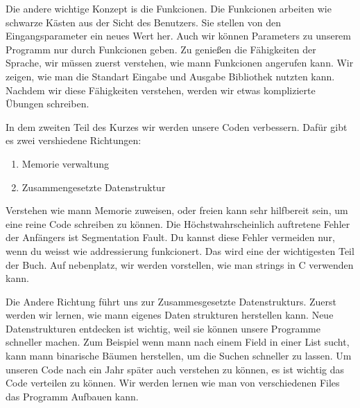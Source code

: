 Die andere wichtige Konzept is die Funkcionen. Die Funkcionen arbeiten wie schwarze K\"asten aus der Sicht des Benutzers. Sie stellen von
den Eingangsparameter ein neues Wert her. Auch wir können Parameters zu unserem Programm nur durch Funkcionen geben.  Zu genießen
die Fähigkeiten der Sprache, wir müssen zuerst verstehen, wie mann Funkcionen angerufen kann. Wir zeigen,
wie man die Standart Eingabe und Ausgabe Bibliothek nutzten kann. Nachdem wir diese F\"ahigkeiten verstehen, werden wir etwas
komplizierte \"Ubungen schreiben.

In dem zweiten Teil des Kurzes wir werden unsere Coden verbessern. Dafür gibt es zwei vershiedene
Richtungen:
\begin{enumerate}
\item Memorie verwaltung
\item Zusammengesetzte Datenstruktur
\end{enumerate}

Verstehen wie mann Memorie zuweisen, oder freien kann sehr hilfbereit sein, um eine reine Code schreiben zu können.
Die Höchstwahrscheinlich auftretene Fehler der Anfängers ist Segmentation Fault. Du kannst diese Fehler vermeiden nur, wenn
du weisst wie addressierung funkcionert. Das wird eine der wichtigesten Teil der Buch. Auf nebenplatz, wir werden
vorstellen, wie man strings in C verwenden kann.

Die Andere Richtung führt uns zur Zusammesgesetzte Datenstrukturs. Zuerst werden wir lernen, wie mann eigenes Daten strukturen herstellen
kann. Neue Datenstrukturen entdecken ist wichtig, weil sie können unsere Programme schneller machen. Zum Beispiel wenn mann nach
einem Field in einer List sucht, kann mann binarische Bäumen herstellen, um die Suchen schneller zu lassen. Um unseren Code
nach ein Jahr später auch verstehen zu können, es ist wichtig das Code verteilen zu können. Wir werden lernen wie man
von verschiedenen Files das Programm Aufbauen kann.

